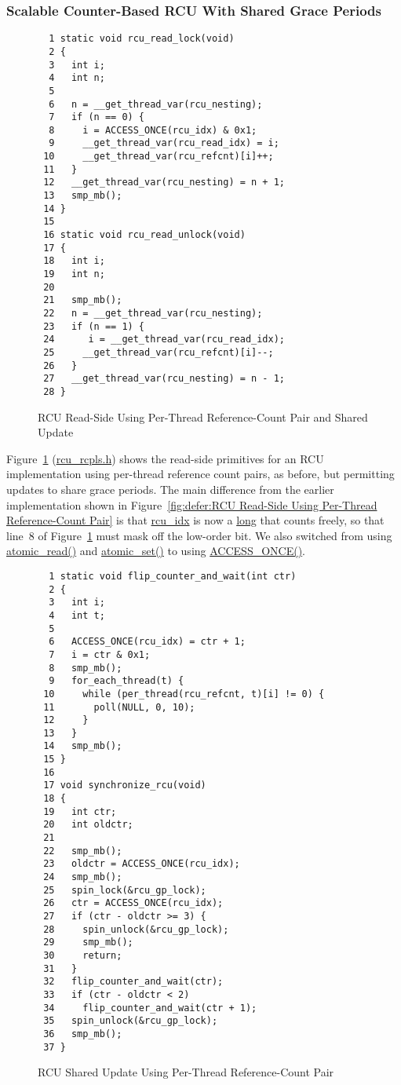 \subsubsection{Scalable Counter-Based RCU With Shared Grace Periods}
\label{defer:Scalable Counter-Based RCU With Shared Grace Periods}

\begin{figure}[tbp]
{ \scriptsize
\begin{verbatim}
  1 static void rcu_read_lock(void)
  2 {
  3   int i;
  4   int n;
  5 
  6   n = __get_thread_var(rcu_nesting);
  7   if (n == 0) {
  8     i = ACCESS_ONCE(rcu_idx) & 0x1;
  9     __get_thread_var(rcu_read_idx) = i;
 10     __get_thread_var(rcu_refcnt)[i]++;
 11   }
 12   __get_thread_var(rcu_nesting) = n + 1;
 13   smp_mb();
 14 }
 15 
 16 static void rcu_read_unlock(void)
 17 {
 18   int i;
 19   int n;
 20 
 21   smp_mb();
 22   n = __get_thread_var(rcu_nesting);
 23   if (n == 1) {
 24      i = __get_thread_var(rcu_read_idx);
 25     __get_thread_var(rcu_refcnt)[i]--;
 26   }
 27   __get_thread_var(rcu_nesting) = n - 1;
 28 }
\end{verbatim}
}
\caption{RCU Read-Side Using Per-Thread Reference-Count Pair and Shared Update}
\label{fig:defer:RCU Read-Side Using Per-Thread Reference-Count Pair and Shared Update}
\end{figure}

Figure~\ref{fig:defer:RCU Read-Side Using Per-Thread Reference-Count Pair and Shared Update}
(\url{rcu_rcpls.h})
shows the read-side primitives for an RCU implementation using per-thread
reference count pairs, as before, but permitting updates to share
grace periods.
The main difference from the earlier implementation shown in
Figure~\ref{fig:defer:RCU Read-Side Using Per-Thread Reference-Count Pair}
is that \url{rcu_idx} is now a \url{long} that counts freely,
so that line~8 of
Figure~\ref{fig:defer:RCU Read-Side Using Per-Thread Reference-Count Pair and Shared Update}
must mask off the low-order bit.
We also switched from using \url{atomic_read()} and \url{atomic_set()}
to using \url{ACCESS_ONCE()}.

\begin{figure}[tbp]
{ \scriptsize
\begin{verbatim}
  1 static void flip_counter_and_wait(int ctr)
  2 {
  3   int i;
  4   int t;
  5 
  6   ACCESS_ONCE(rcu_idx) = ctr + 1;
  7   i = ctr & 0x1;
  8   smp_mb();
  9   for_each_thread(t) {
 10     while (per_thread(rcu_refcnt, t)[i] != 0) {
 11       poll(NULL, 0, 10);
 12     }
 13   }
 14   smp_mb();
 15 }
 16 
 17 void synchronize_rcu(void)
 18 {
 19   int ctr;
 20   int oldctr;
 21 
 22   smp_mb();
 23   oldctr = ACCESS_ONCE(rcu_idx);
 24   smp_mb();
 25   spin_lock(&rcu_gp_lock);
 26   ctr = ACCESS_ONCE(rcu_idx);
 27   if (ctr - oldctr >= 3) {
 28     spin_unlock(&rcu_gp_lock);
 29     smp_mb();
 30     return;
 31   }
 32   flip_counter_and_wait(ctr);
 33   if (ctr - oldctr < 2)
 34     flip_counter_and_wait(ctr + 1);
 35   spin_unlock(&rcu_gp_lock);
 36   smp_mb();
 37 }
\end{verbatim}
}
\caption{RCU Shared Update Using Per-Thread Reference-Count Pair}
\label{fig:defer:RCU Shared Update Using Per-Thread Reference-Count Pair}
\end{figure}

